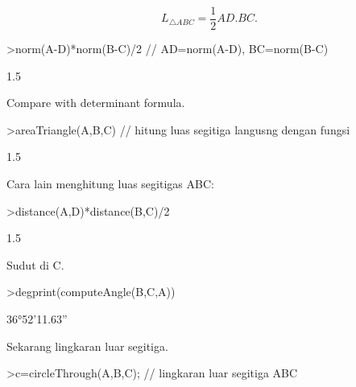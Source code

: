 \documentclass[a4paper,10pt]{article}
\begin{document}
\begin{eulernotebook}
\begin{eulercomment}
\begin{eulercomment}
\begin{eulercomment}
\begin{eulercomment}
\begin{eulercomment}
\begin{eulercomment}
\begin{eulercomment}
\begin{eulercomment}
\begin{eulercomment}
\begin{eulercomment}
\begin{eulercomment}
\begin{eulercomment}
\begin{eulercomment}
\begin{eulercomment}
\begin{eulercomment}
\begin{eulercomment}
\begin{eulercomment}
\begin{eulercomment}
\begin{eulercomment}
\begin{eulercomment}
\begin{eulercomment}
\begin{eulercomment}
\begin{eulercomment}
\begin{eulercomment}
\begin{eulercomment}
\begin{eulercomment}
\begin{eulercomment}
\begin{eulercomment}
\begin{eulercomment}
\begin{eulercomment}
\begin{eulercomment}
\end{eulercomment}
\begin{eulerformula}
\[
L_{\triangle ABC}= \frac{1}{2}AD.BC.
\]
\end{eulerformula}
\begin{eulerprompt}
>norm(A-D)*norm(B-C)/2 // AD=norm(A-D), BC=norm(B-C)
\end{eulerprompt}
\begin{euleroutput}
  1.5
\end{euleroutput}
\begin{eulercomment}
Compare with determinant formula.
\end{eulercomment}
\begin{eulerprompt}
>areaTriangle(A,B,C) // hitung luas segitiga langusng dengan fungsi
\end{eulerprompt}
\begin{euleroutput}
  1.5
\end{euleroutput}
\begin{eulercomment}
Cara lain menghitung luas segitigas ABC:
\end{eulercomment}
\begin{eulerprompt}
>distance(A,D)*distance(B,C)/2
\end{eulerprompt}
\begin{euleroutput}
  1.5
\end{euleroutput}
\begin{eulercomment}
Sudut di C.
\end{eulercomment}
\begin{eulerprompt}
>degprint(computeAngle(B,C,A))
\end{eulerprompt}
\begin{euleroutput}
  36°52'11.63''
\end{euleroutput}
\begin{eulercomment}
Sekarang lingkaran luar segitiga.
\end{eulercomment}
\begin{eulerprompt}
>c=circleThrough(A,B,C); // lingkaran luar segitiga ABC

\end{eulerprompt}
\end{eulercomment}
\end{eulercomment}
\end{eulercomment}
\end{eulercomment}
\end{eulercomment}
\end{eulercomment}
\end{eulercomment}
\end{eulercomment}
\end{eulercomment}
\end{eulercomment}
\end{eulercomment}
\end{eulercomment}
\end{eulercomment}
\end{eulercomment}
\end{eulercomment}
\end{eulercomment}
\end{eulercomment}
\end{eulercomment}
\end{eulercomment}
\end{eulercomment}
\end{eulercomment}
\end{eulercomment}
\end{eulercomment}
\end{eulercomment}
\end{eulercomment}
\end{eulercomment}
\end{eulercomment}
\end{eulercomment}
\end{eulercomment}
\end{eulercomment}
\end{eulernotebook}
\end{document}
